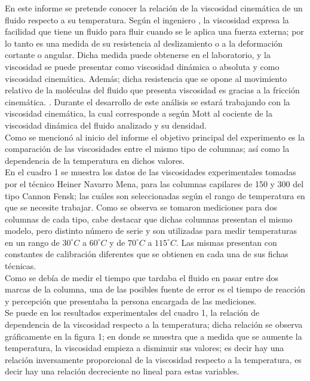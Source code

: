 \documentclass[12pt, letterpaper]{article}
\begin{document}
En este informe se pretende conocer la relación de la viscosidad cinemática de un fluido respecto a su temperatura. Según el ingeniero \cite{marcano}, la viscosidad  expresa la facilidad que tiene un fluido para fluir cuando se le aplica una fuerza externa; por lo tanto es una medida de su resistencia al deslizamiento o a la deformación cortante o angular.  Dicha medida puede obtenerse en el laboratorio, y la viscosidad se puede presentar como viscosidad dinámica o absoluta y como  viscosidad cinemática. Además; dicha resistencia que se opone al movimiento relativo de la moléculas del fluido que presenta viscosidad es gracias a la fricción cinemática. \cite{mott}. Durante el desarrollo de este análisis se estará trabajando con la viscosidad cinemática, la cual corresponde a según Mott al cociente de la viscosidad dinámica del fluido analizado y su densidad.\\
Como se mencionó al inicio del informe el objetivo principal del experimento es la comparación de las viscosidades entre el mismo tipo de columnas; así como la dependencia de la temperatura en dichos valores.\\ 
En el cuadro 1 se muestra los datos de las viscosidades experimentales tomadas por el técnico Heiner Navarro Mena, para las columnas capilares de 150 y 300 del tipo Cannon Fensk; las cuáles son seleccionadas según el rango de temperatura en que se necesite trabajar. Como se observa se tomaron mediciones para dos columnas de cada tipo, cabe destacar que dichas columnas presentan el mismo modelo, pero distinto número de serie y son utilizadas para medir temperaturas en un rango de $30^{\circ}C$ a $60^{\circ}C$ y de $70^{\circ}C$ a $115^{\circ}C$. Las mismas presentan con constantes de calibración diferentes que se obtienen en cada una de sus fichas técnicas.\\ 
Como se debía de medir el tiempo que tardaba el fluido en pasar entre dos marcas de la columna, una de las posibles fuente de error es el tiempo de reacción y percepción que presentaba la persona encargada de las mediciones.\\
Se puede en los resultados experimentales del cuadro 1, la relación de dependencia de la viscosidad respecto a la temperatura; dicha relación se observa gráficamente en la figura 1; en donde se muestra que a medida que se aumente la temperatura, la viscosidad empieza a disminuir sus valores; es decir hay una relación inversamente proporcional de la viscosidad respecto a la temperatura, es decir hay una relación decreciente no lineal para estas variables.\\
\end{document}
